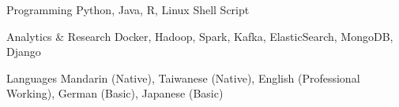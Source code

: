 


\begin{cvskills}


\cvskill
{Programming} %
{Python, Java, R, Linux Shell Script} %


\cvskill
{Analytics \& Research} %
{Docker, Hadoop, Spark, Kafka, ElasticSearch, MongoDB, Django} %


\cvskill
{Languages} %
{Mandarin (Native), Taiwanese (Native), English (Professional Working), German (Basic), Japanese (Basic)} %


\end{cvskills}